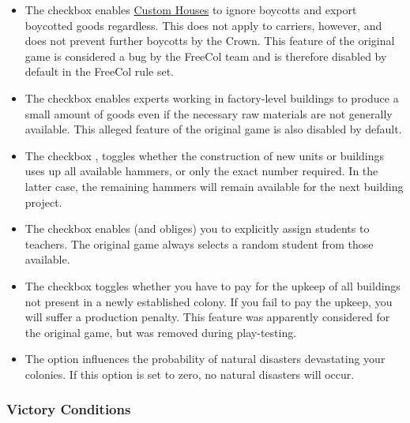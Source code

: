\documentclass[12pt]{book}
\begin{document}
\begin{itemize}

\item The checkbox  enables
  \hyperlink{Custom House}{Custom Houses} to \hypertarget{ignore
    boycotts}{ignore boycotts} and export
  boycotted goods regardless. This does not apply to carriers,
  however, and does not prevent further boycotts by the Crown. This
  feature of the original game is considered a bug by the FreeCol team
  and is therefore disabled by default in the FreeCol rule set.

\item The checkbox  enables experts
  working in factory-level buildings to produce a small amount of
  goods even if the necessary raw materials are not generally
  available. This alleged feature of the original game is also
  disabled by default.

\item The checkbox , toggles whether
  the construction of new units or buildings uses up all available
  hammers, or only the exact number required. In the latter case, the
  remaining hammers will remain available for the next building
  project.

\item The checkbox  enables (and
  obliges) you to explicitly assign students to teachers. The original
  game always selects a random student from those available.

\item The checkbox  toggles whether
  you have to pay for the upkeep of all buildings not present in a
  newly established colony. If you fail to pay the upkeep, you will
  suffer a production penalty. This feature was apparently considered
  for the original game, but was removed during play-testing.

\item The option  influences the probability
  of natural disasters devastating your colonies. If this option is
  set to zero, no natural disasters will occur.

\end{itemize}


\hypertarget{victory conditions}{\subsubsection{Victory Conditions}}
\end{document}
